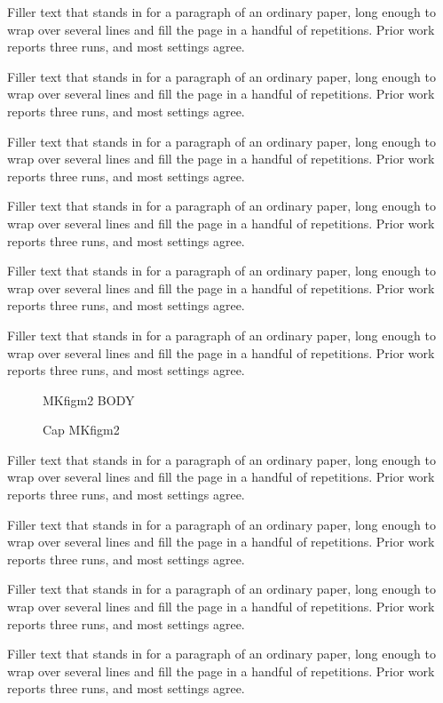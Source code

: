 \documentclass{article}
\begin{document}
Filler text that stands in for a paragraph of an ordinary paper, long enough to wrap over several lines and fill the page in a handful of repetitions. Prior work reports three runs, and most settings agree.\par
Filler text that stands in for a paragraph of an ordinary paper, long enough to wrap over several lines and fill the page in a handful of repetitions. Prior work reports three runs, and most settings agree.\par
Filler text that stands in for a paragraph of an ordinary paper, long enough to wrap over several lines and fill the page in a handful of repetitions. Prior work reports three runs, and most settings agree.\par
Filler text that stands in for a paragraph of an ordinary paper, long enough to wrap over several lines and fill the page in a handful of repetitions. Prior work reports three runs, and most settings agree.\par
Filler text that stands in for a paragraph of an ordinary paper, long enough to wrap over several lines and fill the page in a handful of repetitions. Prior work reports three runs, and most settings agree.\par
Filler text that stands in for a paragraph of an ordinary paper, long enough to wrap over several lines and fill the page in a handful of repetitions. Prior work reports three runs, and most settings agree.\par
\begin{figure}[t]\centering MKfigm2 BODY\caption{Cap MKfigm2}\label{fig:m2}\end{figure}
Filler text that stands in for a paragraph of an ordinary paper, long enough to wrap over several lines and fill the page in a handful of repetitions. Prior work reports three runs, and most settings agree.\par
Filler text that stands in for a paragraph of an ordinary paper, long enough to wrap over several lines and fill the page in a handful of repetitions. Prior work reports three runs, and most settings agree.\par
Filler text that stands in for a paragraph of an ordinary paper, long enough to wrap over several lines and fill the page in a handful of repetitions. Prior work reports three runs, and most settings agree.\par
Filler text that stands in for a paragraph of an ordinary paper, long enough to wrap over several lines and fill the page in a handful of repetitions. Prior work reports three runs, and most settings agree.\par
\end{document}
